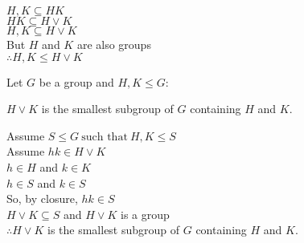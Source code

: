 \documentclass[letterpaper,12pt,fleqn]{article}
\begin{document}
\begin{theproof}
  $H,K\subseteq HK$ \\
  $HK\subseteq H\vee K$ \\
  $H,K\subseteq H\vee K$ \\
  But $H$ and $K$ are also groups \\
  $\therefore H,K\le H\vee K$
\end{theproof}

\begin{theorem}
  Let $G$ be a group and $H,K\le G$:

  $H\vee K$ is the smallest subgroup of $G$ containing $H$ and $K$.
\end{theorem}

\begin{theproof}
  Assume $S\le G\ \mbox{such that}\ H,K\le S$ \\
  Assume $hk\in H\vee K$ \\
  $h\in H$ and $k\in K$ \\
  $h\in S$ and $k\in S$ \\
  So, by closure, $hk\in S$ \\
  $H\vee K\subseteq S$ and $H\vee K$ is a group \\
  $\therefore H\vee K$ is the smallest subgroup of $G$ containing $H$ and $K$.
\end{theproof}
\end{document}
